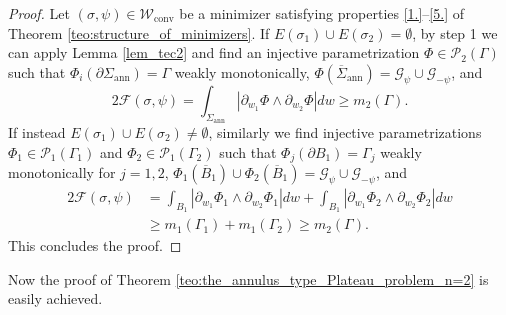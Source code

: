\documentclass[11pt]{article}
\numberwithin{equation}{section}
\newcommand\admclassconv{{\mathcal W_\mathrm{conv}}}
\newcommand{\openannulus}{\Sigma_\mathrm{ann}}
\theoremstyle{definition}
\begin{document}
\begin{proof}
Let $(\sigma,\psi)\in\admclassconv$ be a minimizer satisfying
properties
\ref{1.}--\ref{5.} of
Theorem \ref{teo:structure_of_minimizers}.
If $E(\sigma_1)\cup E(\sigma_2)=\emptyset$, by step 1 we can apply Lemma \ref{lem_tec2} and find an injective parametrization
$\Phi\in \mathcal P_2(\Gamma)$ such that
$\Phi_i(\partial \openannulus)=\Gamma$ weakly monotonically,
$\Phi(\overline\Sigma_\mathrm{ann})=\mathcal G_\psi\cup \mathcal G_{-\psi}$, and
\[
2\mathcal{F}(\sigma,\psi)=\int_{\Sigma_\mathrm{ann}}|\partial_{w_1}\Phi\wedge\partial_{w_2}\Phi|dw\geq m_2(\Gamma).
\]
If instead $E(\sigma_1)\cup E(\sigma_2)\ne\emptyset$, similarly we find injective parametrizations
$\Phi_1\in \mathcal P_1(\Gamma_1)$ and $\Phi_2\in \mathcal P_1(\Gamma_2) $
such that $\Phi_j(\partial B_1)=\Gamma_j$ weakly monotonically
for $j=1,2$, $\Phi_1(\overline B_1)\cup\Phi_2(\overline B_1)=\mathcal G_\psi\cup \mathcal G_{-\psi}$, and
\begin{align*}
2\mathcal{F}(\sigma,\psi)&=\int_{B_{1}}|\partial_{w_1}\Phi_1\wedge\partial_{w_2}\Phi_1|dw+\int_{B_{1}}|\partial_{w_1}\Phi_2\wedge\partial_{w_2}\Phi_2|dw\\&\geq m_1(\Gamma_1)+ m_1(\Gamma_2)\ge m_2(\Gamma).
\end{align*}
This concludes the proof.
\end{proof}

Now the proof of Theorem \ref{teo:the_annulus_type_Plateau_problem_n=2} is easily achieved.
\end{document}

